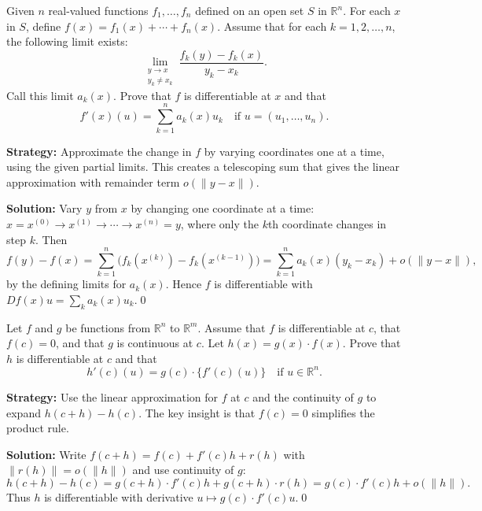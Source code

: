 \begin{problembox}
\begin{problemstatement}
Given \( n \) real-valued functions \( f_1, \ldots, f_n \) defined on an open set \( S \) in \( \mathbb{R}^n \). For each \( x \) in \( S \), define \( f(x) = f_1(x) + \cdots + f_n(x) \). Assume that for each \( k = 1, 2, \ldots, n \), the following limit exists:
\[\lim_{\substack{y \to x \\ y_k \neq x_k}} \frac{f_k(y) - f_k(x)}{y_k - x_k}.\]
Call this limit \( a_k(x) \). Prove that \( f \) is differentiable at \( x \) and that
\[f'(x)(u) = \sum_{k=1}^{n} a_k(x) u_k \quad \text{if } u = (u_1, \ldots, u_n).\]
\end{problemstatement}
\end{problembox}

\noindent\textbf{Strategy:} Approximate the change in \( f \) by varying coordinates one at a time, using the given partial limits. This creates a telescoping sum that gives the linear approximation with remainder term \( o(\|y-x\|) \).

\bigskip\noindent\textbf{Solution:}
Vary $y$ from $x$ by changing one coordinate at a time: $x=x^{(0)}\to x^{(1)}\to\cdots\to x^{(n)}=y$, where only the $k$th coordinate changes in step $k$. Then
\[f(y)-f(x)=\sum_{k=1}^n\big(f_k(x^{(k)})-f_k(x^{(k-1)})\big)=\sum_{k=1}^n a_k(x)(y_k-x_k)+o(\|y-x\|),\]
by the defining limits for $a_k(x)$. Hence $f$ is differentiable with $Df(x)u=\sum_k a_k(x)u_k$.\qed


\begin{problembox}
\begin{problemstatement}
Let \( f \) and \( g \) be functions from \( \mathbb{R}^n \) to \( \mathbb{R}^m \). Assume that \( f \) is differentiable at \( c \), that \( f(c) = 0 \), and that \( g \) is continuous at \( c \). Let \( h(x) = g(x) \cdot f(x) \). Prove that \( h \) is differentiable at \( c \) and that
\[h'(c)(u) = g(c) \cdot \{f'(c)(u)\} \quad \text{if } u \in \mathbb{R}^n.\]
\end{problemstatement}
\end{problembox}

\noindent\textbf{Strategy:} Use the linear approximation for \( f \) at \( c \) and the continuity of \( g \) to expand \( h(c+h) - h(c) \). The key insight is that \( f(c) = 0 \) simplifies the product rule.

\bigskip\noindent\textbf{Solution:}
Write $f(c+h)=f(c)+f'(c)h+r(h)$ with $\|r(h)\|=o(\|h\|)$ and use continuity of $g$:
\[h(c+h)-h(c)=g(c+h)\cdot f'(c)h+g(c+h)\cdot r(h)=g(c)\cdot f'(c)h+o(\|h\|).\]
Thus $h$ is differentiable with derivative $u\mapsto g(c)\cdot f'(c)u$.\qed


